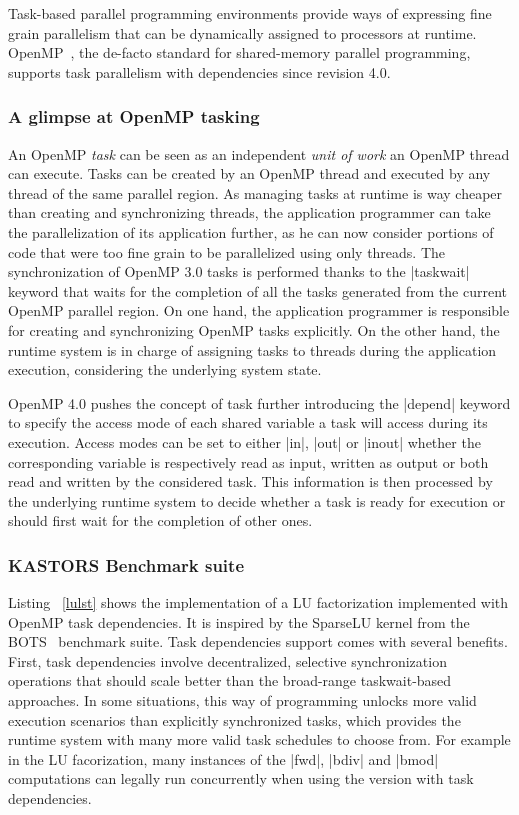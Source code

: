 \documentclass{Styles/llncs}
\begin{document}
Task-based parallel programming environments provide ways of expressing fine grain parallelism that can be dynamically assigned to processors at runtime.
OpenMP~\cite{openmp40}, the de-facto standard for shared-memory parallel programming, supports task parallelism with dependencies since revision 4.0.

\subsubsection{A glimpse at OpenMP tasking}

An OpenMP \emph{task} can be seen as an independent \emph{unit of work} an OpenMP thread can execute.
Tasks can be created by an OpenMP thread and executed by any thread of the same parallel region. 
As managing tasks at runtime is way cheaper than creating and synchronizing threads, the application programmer can take the parallelization of its application further, as he can now consider portions of code that were too fine grain to be parallelized using only threads.
The synchronization of OpenMP 3.0 tasks is performed thanks to the |taskwait| keyword that waits for the completion of all the tasks generated from the current OpenMP parallel region.
On one hand, the application programmer is responsible for creating and synchronizing OpenMP tasks explicitly. 
On the other hand, the runtime system is in charge of assigning tasks to threads during the application execution, considering the underlying system state.

OpenMP 4.0 pushes the concept of task further introducing the |depend| keyword to specify the access mode of each shared variable a task will access during its execution. 
Access modes can be set to either |in|, |out| or |inout| whether the corresponding variable is respectively read as input, written as output or both read and written by the considered task. 
This information is then processed by the underlying runtime system to decide whether a task is ready for execution or should first wait for the completion of other ones.

\subsubsection{KASTORS Benchmark suite}
Listing ~\ref{lulst} shows the implementation of a LU factorization 
implemented with OpenMP task dependencies. It is inspired by the SparseLU kernel from the BOTS~\cite{BOTS} benchmark suite.
Task dependencies support comes with several benefits. First, task
dependencies involve decentralized, selective synchronization operations
that should scale better than the broad-range taskwait-based approaches.
In some situations, this way of programming unlocks more valid execution
scenarios than explicitly synchronized tasks, which provides the runtime
system with many more valid task schedules to choose from. For example in the LU facorization,
many instances of the |fwd|, |bdiv| and |bmod| computations can legally
run concurrently when using the version with task dependencies.
\end{document}
